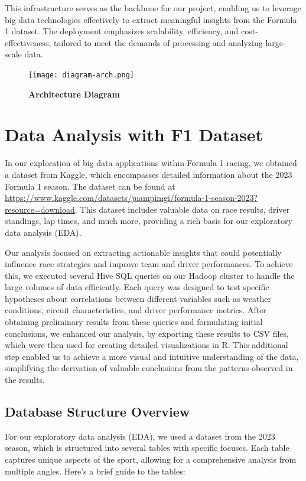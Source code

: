 \documentclass{article}
\begin{document}
This infrastructure serves as the backbone for our project, enabling us to leverage big data technologies effectively to extract meaningful insights from the Formula 1 dataset. The deployment emphasizes scalability, efficiency, and cost-effectiveness, tailored to meet the demands of processing and analyzing large-scale data.

\begin{figure}[H]
    \centering
    \texttt{[image: diagram-arch.png]}
    \caption{\textbf{Architecture Diagram}}
\end{figure}

\section{Data Analysis with F1 Dataset}
In our exploration of big data applications within Formula 1 racing, we obtained a dataset from Kaggle, which encompasses detailed information about the 2023 Formula 1 season. The dataset can be found at \url{https://www.kaggle.com/datasets/juampimgi/formula-1-season-2023?resource=download}. This dataset includes valuable data on race results, driver standings, lap times, and much more, providing a rich basis for our exploratory data analysis (EDA).

Our analysis focused on extracting actionable insights that could potentially influence race strategies and improve team and driver performances. To achieve this, we executed several Hive SQL queries on our Hadoop cluster to handle the large volumes of data efficiently. Each query was designed to test specific hypotheses about correlations between different variables such as weather conditions, circuit characteristics, and driver performance metrics. After obtaining preliminary results from these queries and formulating initial conclusions, we enhanced our analysis, by exporting these results to CSV files, which were then used for creating detailed visualizations in R. This additional step enabled us to achieve a more visual and intuitive understanding of the data, simplifying the derivation of valuable conclusions from the patterns observed in the results.

\subsection{Database Structure Overview}
For our exploratory data analysis (EDA), we used a dataset from the 2023 season, which is structured into several tables with specific focuses. Each table captures unique aspects of the sport, allowing for a comprehensive analysis from multiple angles. Here's a brief guide to the tables:
\end{document}
